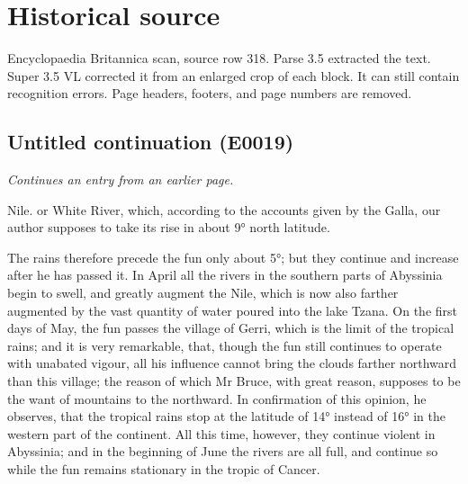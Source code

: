 \documentclass{article}
\begin{document}
\section*{Historical source}
Encyclopaedia Britannica scan, source row 318. Parse 3.5 extracted the text. Super 3.5 VL corrected it from an enlarged crop of each block. It can still contain recognition errors.
Page headers, footers, and page numbers are removed.

\subsection*{Untitled continuation (E0019)}
\textit{Continues an entry from an earlier page.}

Nile. or White River, which, according to the accounts given by the Galla, our author supposes to take its rise in about 9° north latitude.

The rains therefore precede the fun only about 5°; but they continue and increase after he has passed it. In April all the rivers in the southern parts of Abyssinia begin to swell, and greatly augment the Nile, which is now also farther augmented by the vast quantity of water poured into the lake Tzana. On the first days of May, the fun passes the village of Gerri, which is the limit of the tropical rains; and it is very remarkable, that, though the fun still continues to operate with unabated vigour, all his influence cannot bring the clouds farther northward than this village; the reason of which Mr Bruce, with great reason, supposes to be the want of mountains to the northward. In confirmation of this opinion, he observes, that the tropical rains stop at the latitude of 14° instead of 16° in the western part of the continent. All this time, however, they continue violent in Abyssinia; and in the beginning of June the rivers are all full, and continue so while the fun remains stationary in the tropic of Cancer.
\end{document}

